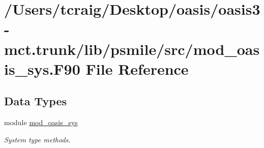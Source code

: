 \hypertarget{mod__oasis__sys_8_f90}{\section{/\+Users/tcraig/\+Desktop/oasis/oasis3-\/mct.trunk/lib/psmile/src/mod\+\_\+oasis\+\_\+sys.F90 File Reference}
\label{mod__oasis__sys_8_f90}
}
\subsection*{Data Types}
\begin{DoxyCompactItemize}
\item 
module \hyperlink{classmod__oasis__sys}{mod\+\_\+oasis\+\_\+sys}
\begin{DoxyCompactList}\small\item\em System type methods. \end{DoxyCompactList}\end{DoxyCompactItemize}
